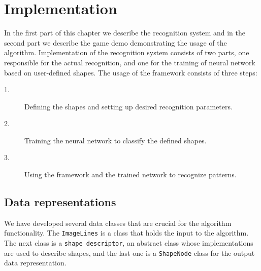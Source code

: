 \chapter{Implementation}
In the first part of this chapter we describe the recognition system and in the second part we describe the game demo demonstrating the usage of the algorithm. Implementation of the recognition system consists of two parts, one responsible for the actual recognition, and one for the training of neural network based on user-defined shapes. The usage of the framework consists of three steps:
\begin{description}
\item[1.] Defining the shapes and setting up desired recognition parameters.
\item[2.] Training the neural network to classify the defined shapes.
\item[3.] Using the framework and the trained network to recognize patterns.
\end{description}

\section{Data representations}
We have developed several data classes that are crucial for the algorithm functionality. The \texttt{ImageLines} is a class that holds the input to the algorithm. The next class is a \texttt{shape descriptor}, an abstract class whose implementations are used to describe shapes, and the last one is a \texttt{ShapeNode} class for the output data representation.

